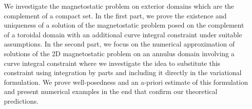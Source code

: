 \documentclass[../../master_thesis.tex]{subfiles}
\begin{document}
We investigate the magnetostatic problem on exterior domains 
which are the complement of a compact set. In the first part, we prove 
the existence and uniqueness of a solution of the magnetostatic problem posed on the
complement of a toroidal domain with an additional curve integral constraint 
under suitable assumptions.
In the second part, we focus on the numerical approximation of solutions 
of the 2D magnetostatic problem
on an 
annulus domain involving a curve integral constraint where we investigate 
the idea to substitute this constraint using integration by parts and including it directly 
in the variational formulation. We prove well-posedness and an a-priori estimate 
of this formulation
and present numerical examples in the end that confirm our theoretical 
predictions.
\end{document}
